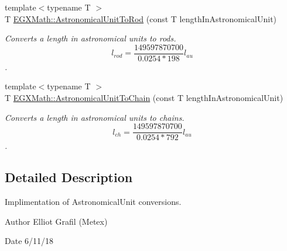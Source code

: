 \begin{DoxyCompactItemize}
{\footnotesize template$<$typename T $>$ }\\T \mbox{\hyperlink{group___e_g_x_math-_conversions-_length_conversions-_astronomical-_astronomical_unit-_surveyors_gab8120fd6b46c2eb849317bb948254c92}{E\+G\+X\+Math\+::\+Astronomical\+Unit\+To\+Rod}} (const T length\+In\+Astronomical\+Unit)
\begin{DoxyCompactList}\small\item\em Converts a length in astronomical units to rods. \[ l_{rod}= \frac{149597870700}{0.0254 * 198} l_{au} \]. \end{DoxyCompactList}\item 
{\footnotesize template$<$typename T $>$ }\\T \mbox{\hyperlink{group___e_g_x_math-_conversions-_length_conversions-_astronomical-_astronomical_unit-_surveyors_gaaceebc92930ed7feb36522f2dad6dffd}{E\+G\+X\+Math\+::\+Astronomical\+Unit\+To\+Chain}} (const T length\+In\+Astronomical\+Unit)
\begin{DoxyCompactList}\small\item\em Converts a length in astronomical units to chains. \[ l_{ch}= \frac{149597870700}{0.0254 * 792} l_{au} \]. \end{DoxyCompactList}\end{DoxyCompactItemize}


\subsection{Detailed Description}
Implimentation of Astronomical\+Unit conversions. 

\begin{DoxyAuthor}{Author}
Elliot Grafil (Metex) 
\end{DoxyAuthor}
\begin{DoxyDate}{Date}
6/11/18 
\end{DoxyDate}
